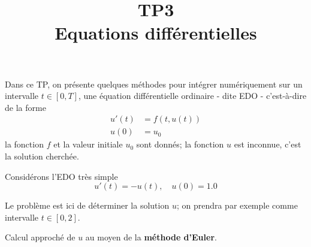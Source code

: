 \documentclass{exam}
\title{TP3\\ Equations différentielles}
\begin{document}
\maketitle


Dans ce TP, on présente quelques méthodes pour intégrer numériquement sur un intervalle $t \in [0, T]$, une équation différentielle ordinaire - dite EDO - c'est-à-dire de la forme
\begin{align*}
u'(t) & =  f(t, u(t))\\
u(0)  & = u_0
\end{align*}
la fonction $f$ et la valeur initiale $u_0$ sont donnés; la fonction $u$ est inconnue, c'est la solution cherchée.

\begin{questions}

\question
Considérons l'EDO très simple
$$u'(t) =  -u(t), \quad u(0)  =  1.0$$

Le problème est ici de déterminer la solution $u$; on prendra par exemple comme intervalle $t \in [0, 2]$.

\question
Calcul approché de $u$ au moyen de la {\bf méthode d'Euler}.
\begin{parts}

\end{parts}
\end{questions}
\end{document}
